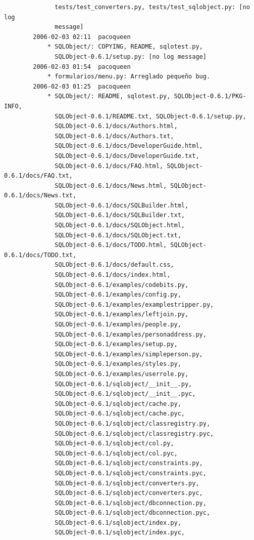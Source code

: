 \documentclass[a4paper]{article}
\begin{document}
\begin{verbatim}
              tests/test_converters.py, tests/test_sqlobject.py: [no log
              message]
        2006-02-03 02:11  pacoqueen
            * SQLObject/: COPYING, README, sqlotest.py,
              SQLObject-0.6.1/setup.py: [no log message]
        2006-02-03 01:54  pacoqueen
            * formularios/menu.py: Arreglado pequeño bug.
        2006-02-03 01:25  pacoqueen
            * SQLObject/: README, sqlotest.py, SQLObject-0.6.1/PKG-INFO,
              SQLObject-0.6.1/README.txt, SQLObject-0.6.1/setup.py,
              SQLObject-0.6.1/docs/Authors.html,
              SQLObject-0.6.1/docs/Authors.txt,
              SQLObject-0.6.1/docs/DeveloperGuide.html,
              SQLObject-0.6.1/docs/DeveloperGuide.txt,
              SQLObject-0.6.1/docs/FAQ.html, SQLObject-0.6.1/docs/FAQ.txt,
              SQLObject-0.6.1/docs/News.html, SQLObject-0.6.1/docs/News.txt,
              SQLObject-0.6.1/docs/SQLBuilder.html,
              SQLObject-0.6.1/docs/SQLBuilder.txt,
              SQLObject-0.6.1/docs/SQLObject.html,
              SQLObject-0.6.1/docs/SQLObject.txt,
              SQLObject-0.6.1/docs/TODO.html, SQLObject-0.6.1/docs/TODO.txt,
              SQLObject-0.6.1/docs/default.css,
              SQLObject-0.6.1/docs/index.html,
              SQLObject-0.6.1/examples/codebits.py,
              SQLObject-0.6.1/examples/config.py,
              SQLObject-0.6.1/examples/examplestripper.py,
              SQLObject-0.6.1/examples/leftjoin.py,
              SQLObject-0.6.1/examples/people.py,
              SQLObject-0.6.1/examples/personaddress.py,
              SQLObject-0.6.1/examples/setup.py,
              SQLObject-0.6.1/examples/simpleperson.py,
              SQLObject-0.6.1/examples/styles.py,
              SQLObject-0.6.1/examples/userrole.py,
              SQLObject-0.6.1/sqlobject/__init__.py,
              SQLObject-0.6.1/sqlobject/__init__.pyc,
              SQLObject-0.6.1/sqlobject/cache.py,
              SQLObject-0.6.1/sqlobject/cache.pyc,
              SQLObject-0.6.1/sqlobject/classregistry.py,
              SQLObject-0.6.1/sqlobject/classregistry.pyc,
              SQLObject-0.6.1/sqlobject/col.py,
              SQLObject-0.6.1/sqlobject/col.pyc,
              SQLObject-0.6.1/sqlobject/constraints.py,
              SQLObject-0.6.1/sqlobject/constraints.pyc,
              SQLObject-0.6.1/sqlobject/converters.py,
              SQLObject-0.6.1/sqlobject/converters.pyc,
              SQLObject-0.6.1/sqlobject/dbconnection.py,
              SQLObject-0.6.1/sqlobject/dbconnection.pyc,
              SQLObject-0.6.1/sqlobject/index.py,
              SQLObject-0.6.1/sqlobject/index.pyc,

\end{verbatim}
\end{document}
